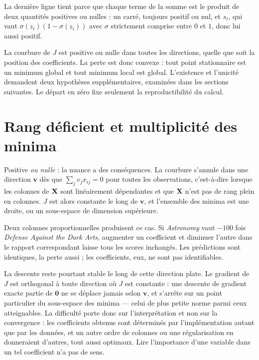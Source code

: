 La dernière ligne tient parce que chaque terme de la somme est le produit de deux
quantités positives ou nulles : un carré, toujours positif ou nul, et $s_i$, qui
vaut $\sigma(z_i)(1-\sigma(z_i))$ avec $\sigma$ strictement comprise entre $0$ et
$1$, donc lui aussi positif.

\begin{resultat}[Convexité]
La courbure de $J$ est positive ou nulle dans toutes les directions, quelle que
soit la position des coefficients. La perte est donc convexe : tout point
stationnaire est un minimum global et tout minimum local est global. L'existence
et l'unicité demandent deux hypothèses supplémentaires, examinées dans les
sections suivantes. Le départ en zéro fixe seulement la reproductibilité du
calcul.
\end{resultat}

\section{Rang déficient et multiplicité des minima}

Positive \emph{ou nulle} : la nuance a des conséquences. La courbure s'annule
dans une direction $\mathbf v$ dès que $\sum_j v_jx_{ij}=0$ pour toutes les
observations, c'est-à-dire lorsque les colonnes de $\mathbf{X}$ sont linéairement
dépendantes et que $\mathbf{X}$ n'est pas de rang plein en colonnes.
$J$ est alors constante le long de $\mathbf v$, et l'ensemble des minima est une
droite, ou un sous-espace de dimension supérieure.

Deux colonnes proportionnelles produisent ce cas. Si \emph{Astronomy} vaut
$-100$ fois \emph{Defense Against the Dark Arts}, augmenter un coefficient et
diminuer l'autre dans le rapport correspondant laisse tous les scores inchangés.
Les prédictions sont identiques, la perte aussi ; les coefficients, eux, ne sont
pas identifiables.

La descente reste pourtant stable le long de cette direction plate. Le gradient
de $J$ est orthogonal à toute direction où $J$ est constante : une descente de
gradient exacte partie de $\mathbf 0$ ne se déplace jamais selon $\mathbf v$, et
s'arrête sur un point particulier du sous-espace des minima --- celui de plus
petite norme parmi ceux atteignables. La difficulté porte donc sur
l'interprétation et non sur la convergence : les coefficients obtenus sont
déterminés par l'implémentation autant que par les données, et un autre ordre de
colonnes ou une régularisation en donneraient d'autres, tout aussi optimaux. Lire
l'importance d'une variable dans un tel coefficient n'a pas de sens.

